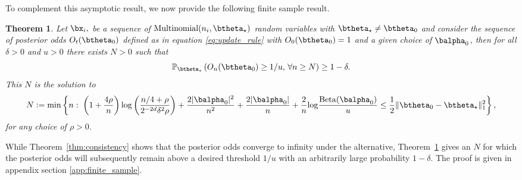 \documentclass[11pt]{article}
\def\log{{\rm log}}
\newcommand{\Beta}{\mathrm{Beta}}
\newtheorem{thm}{Theorem}[section]
\newcommand{\df}{\vcentcolon=}
\newcommand{\pfrac}[2]{\left(\frac{#1}{#2}\right)}
\begin{document}
To complement this asymptotic result, we now provide the following finite sample result.
\begin{thm}
  \label{thm:finite_sample}
\noindent Let $\bx_i,$ be a sequence of $\text{Multinomial}(n_i,\btheta_{\star})$ random variables with $\btheta_{\star} \neq \btheta_0$ and consider the sequence of posterior odds $O_t(\btheta_0)$ defined as in equation \eqref{eq:update_rule} with $O_0(\btheta_0)=1$ and a given choice of $\balpha_0$, then
for all $\delta > 0$ and $u > 0$ there exists $N > 0$ such that 
\begin{equation}
  \label{eq:finite_sample}
\mathbb{P}_{\btheta_{\star}}\left( O_n(\btheta_0) \geq 1/u, \, \forall n \geq N\right) \geq 1-\delta.
\end{equation}
This $N$ is the solution to 
\[
  N \df
  \min
  \left\{
    n:\;
      \left(1 + \frac{4\rho}{n}\right)
      \log\pfrac{n/4+\rho}{2^{-2d}\delta^2 \rho}
    +
      \frac{2|\balpha_0|^2}{n^2} + \frac{2|\balpha_0|}{n}
      +
    \frac{2}{n}\log\frac{\Beta(\balpha_0)}{u}
    \leq
    \frac{1}{2}\Vert \btheta_0- \btheta_{\star}\Vert_{1}^2
  \right\},
\] for any choice of $\rho > 0$. 
\end{thm}

While Theorem~\ref{thm:consistency} shows that the posterior odds converge to infinity under the alternative, Theorem~\ref{thm:finite_sample} gives an $N$
for which the posterior odds will subsequently remain above a desired threshold $1/u$ with an arbitrarily large probability $1-\delta$.
The proof is given in appendix section \ref{app:finite_sample}.
\end{document}

